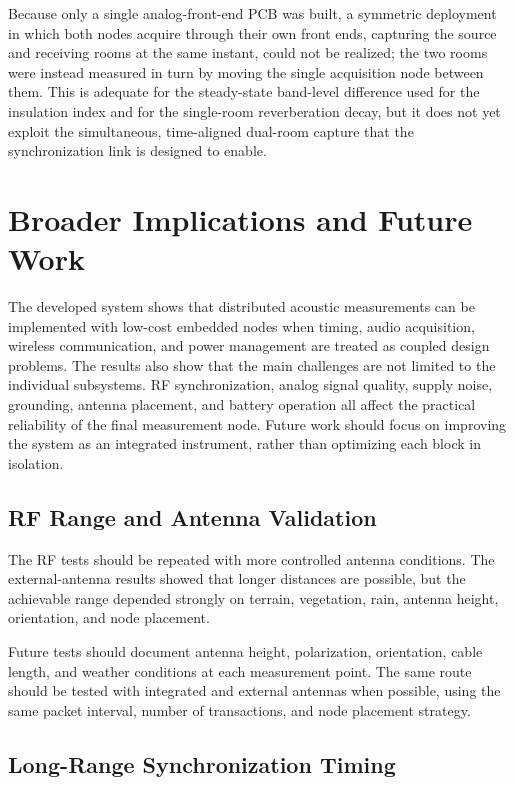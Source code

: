 Because only a single analog-front-end PCB was built, a symmetric deployment in which both nodes acquire through their own front ends, capturing the source and receiving rooms at the same instant, could not be realized; the two rooms were instead measured in turn by moving the single acquisition node between them. This is adequate for the steady-state band-level difference used for the insulation index and for the single-room reverberation decay, but it does not yet exploit the simultaneous, time-aligned dual-room capture that the synchronization link is designed to enable.


\section{Broader Implications and Future Work}

The developed system shows that distributed acoustic measurements can be implemented with low-cost embedded nodes when timing, audio acquisition, wireless communication, and power management are treated as coupled design problems. The results also show that the main challenges are not limited to the individual subsystems. RF synchronization, analog signal quality, supply noise, grounding, antenna placement, and battery operation all affect the practical reliability of the final measurement node. Future work should focus on improving the system as an integrated instrument, rather than optimizing each block in isolation.


\subsection{RF Range and Antenna Validation}

The RF tests should be repeated with more controlled antenna conditions. The external-antenna results showed that longer distances are possible, but the achievable range depended strongly on terrain, vegetation, rain, antenna height, orientation, and node placement.

Future tests should document antenna height, polarization, orientation, cable length, and weather conditions at each measurement point. The same route should be tested with integrated and external antennas when possible, using the same packet interval, number of transactions, and node placement strategy.

\subsection{Long-Range Synchronization Timing}

